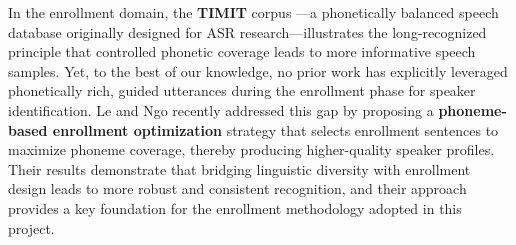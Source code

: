 In the enrollment domain, the \textbf{TIMIT} corpus \cite{garofolo1993timit}---a phonetically balanced speech database originally designed for ASR research---illustrates the long-recognized principle that controlled phonetic coverage leads to more informative speech samples. Yet, to the best of our knowledge, no prior work has explicitly leveraged phonetically rich, guided utterances during the enrollment phase for speaker identification. Le and Ngo \cite{longquocandnhut} recently addressed this gap by proposing a \textbf{phoneme-based enrollment optimization} strategy that selects enrollment sentences to maximize phoneme coverage, thereby producing higher-quality speaker profiles. Their results demonstrate that bridging linguistic diversity with enrollment design leads to more robust and consistent recognition, and their approach provides a key foundation for the enrollment methodology adopted in this project.